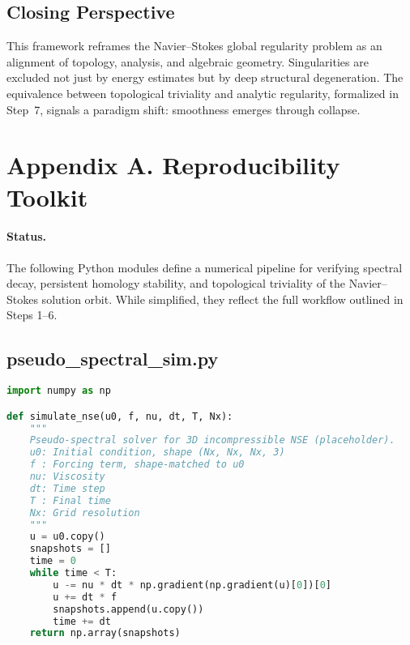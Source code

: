\documentclass[11pt]{article}
\theoremstyle{definition}
\begin{document}
\subsection*{Closing Perspective}

This framework reframes the Navier–Stokes global regularity problem as an alignment of topology, analysis, and algebraic geometry. Singularities are excluded not just by energy estimates but by deep structural degeneration. The equivalence between topological triviality and analytic regularity, formalized in Step~7, signals a paradigm shift: smoothness emerges through collapse.




\section{Appendix A. Reproducibility Toolkit}
\label{sec:appendixA}

\paragraph{Status.}
The following Python modules define a numerical pipeline for verifying spectral decay, persistent homology stability, and topological triviality of the Navier--Stokes solution orbit. While simplified, they reflect the full workflow outlined in Steps 1–6.

\subsection*{pseudo\_spectral\_sim.py}
\begin{lstlisting}[language=Python]
import numpy as np

def simulate_nse(u0, f, nu, dt, T, Nx):
    """
    Pseudo-spectral solver for 3D incompressible NSE (placeholder).
    u0: Initial condition, shape (Nx, Nx, Nx, 3)
    f : Forcing term, shape-matched to u0
    nu: Viscosity
    dt: Time step
    T : Final time
    Nx: Grid resolution
    """
    u = u0.copy()
    snapshots = []
    time = 0
    while time < T:
        u -= nu * dt * np.gradient(np.gradient(u)[0])[0]
        u += dt * f
        snapshots.append(u.copy())
        time += dt
    return np.array(snapshots)
\end{lstlisting}
\end{document}
